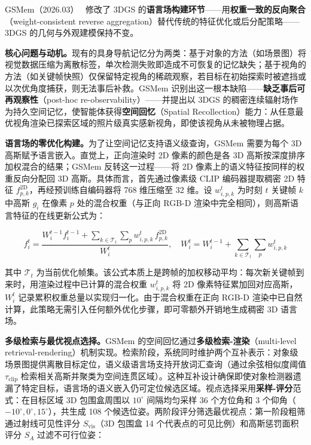 GSMem（2026.03）~\cite{2603_19137} 修改了 3DGS 的\textbf{语言场构建环节}——用\textbf{权重一致的反向聚合}（weight-consistent reverse aggregation）替代传统的特征优化或后分配策略——3DGS 的几何与外观建模保持不变。

\textbf{核心问题与动机。}现有的具身导航记忆分为两类：基于对象的方法（如场景图）将视觉数据压缩为离散标签，单次检测失败即造成不可恢复的记忆缺失；基于视角的方法（如关键帧快照）仅保留特定视角的稀疏观察，若目标在初始探索时被遮挡或以次优角度捕获，则无法事后补救。GSMem 识别出这一根本缺陷——\textbf{缺乏事后可再观察性}（post-hoc re-observability）——并提出以 3DGS 的稠密连续辐射场作为持久空间记忆，使智能体获得\textbf{空间回忆}（Spatial Recollection）能力：从任意最优视角渲染已探索区域的照片级真实感新视角，即使该视角从未被物理占据。

\textbf{语言场的零优化构建。}为了让空间记忆支持语义级查询，GSMem 需要为每个 3D 高斯赋予语言嵌入。直觉上，正向渲染时 2D 像素的颜色是各 3D 高斯按深度排序加权混合的结果；GSMem 反转这一过程——将 2D 像素上的语义特征按同样的权重反向分配回 3D 高斯。具体而言，首先通过像素级 CLIP 编码器提取稠密 2D 特征 $f_{p,k}^{\text{2D}}$，再经预训练自编码器将 768 维压缩至 32 维。设 $w_{i,p,k}^t$ 为时刻 $t$ 关键帧 $k$ 中高斯 $g_i$ 在像素 $p$ 处的混合权重（与正向 RGB-D 渲染中完全相同），则高斯语言特征的在线更新公式为：

\begin{equation}
f_i^t = \frac{W_i^{t-1} f_i^{t-1} + \sum_{k \in \mathcal{T}_t} \sum_p w_{i,p,k}^t \, f_{p,k}^{\text{2D}}}{W_i^t}, \quad W_i^t = W_i^{t-1} + \sum_{k \in \mathcal{T}_t} \sum_p w_{i,p,k}^t
\end{equation}

其中 $\mathcal{T}_t$ 为当前优化帧集。该公式本质上是跨帧的加权移动平均：每次新关键帧到来时，用渲染过程中已计算的混合权重 $w_{i,p,k}^t$ 将 2D 像素特征累加回对应高斯，$W_i^t$ 记录累积权重总量以实现归一化。由于混合权重在正向 RGB-D 渲染中已自然计算，此策略无需引入任何额外优化步骤，即可零额外开销地生成稠密 3D 语言场。

\textbf{多级检索与最优视点选择。}GSMem 的空间回忆通过\textbf{多级检索-渲染}（multi-level retrieval-rendering）机制实现。检索阶段，系统同时维护两个互补表示：对象级场景图提供离散目标定位，语义级语言场支持开放词汇查询（通过余弦相似度阈值 $\tau_{\text{clip}}$ 检索相关高斯并聚类为空间连贯区域）。这种互补设计确保即使对象检测器遗漏了特定目标，语言场的语义嵌入仍可定位候选区域。视点选择采用\textbf{采样-评分}范式：在目标区域 3D 包围盒周围以 $10^\circ$ 间隔均匀采样 36 个方位角和 3 个仰角（$-10^\circ, 0^\circ, 15^\circ$），共生成 108 个候选位姿。两阶段评分筛选最优视点：第一阶段粗筛通过射线可见性评分 $S_{\text{vis}}$（3D 包围盒 14 个代表点的可见比例）和高斯惩罚面积评分 $S_A$ 过滤不可行位姿：

